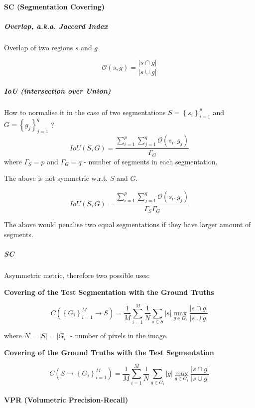 \paragraph{SC (Segmentation Covering)}


\subparagraph*{Overlap, a.k.a. Jaccard Index}

Overlap of two regions $s$ and $g$

\[
\mathcal{O}\left(s,g\right)=\frac{\left|s\cap g\right|}{\left|s\cup g\right|}
\]

\subparagraph*{IoU (intersection over Union)}

How to normalise it in the case of two segmentations $S=\left\{ {s_{i}}\right\} _{i=1}^{p}$
and $G=\left\{ {g_{j}}\right\} _{j=1}^{q}$ ?
\[
IoU(S,G)=\frac{\sum\limits _{i=1}^{p}\sum\limits _{j=1}^{q}\mathcal{O}\left(s_{i},g_{j}\right)}{\Gamma_{G}}
\]
where $\Gamma_{S}=p$ and $\Gamma_{G}=q$ - number of segments in
each segmentation.

The above is not symmetric w.r.t. $S$ and $G$.

\[
IoU(S,G)=\frac{\sum\limits _{i=1}^{p}\sum\limits _{j=1}^{q}\mathcal{O}\left(s_{i},g_{j}\right)}{\Gamma_{S}\Gamma_{G}}
\]


The above would penalise two equal segmentations if they have larger
amount of segments.


\subparagraph*{SC}

Asymmetric metric, therefore two possible uses:

\textbf{Covering of the Test Segmentation with the Ground Truths}

\[
C\left(\left\{ {G_{i}}\right\} _{i=1}^{M}\longrightarrow S\right)=\frac{1}{M}\sum\limits _{i=1}^{M}\frac{1}{N}\sum\limits _{s\in S}\left|s\right|\max_{g\in G_{i}}\frac{\left|s\cap g\right|}{\left|s\cup g\right|}
\]

where $N=\left|S\right|=\left|G_{i}\right|$ - number of pixels in
the image.

\textbf{Covering of the Ground Truths with the Test Segmentation}

\[
C\left(S\longrightarrow\left\{ {G_{i}}\right\} _{i=1}^{M}\right)=\frac{1}{M}\sum\limits _{i=1}^{M}\frac{1}{N}\sum\limits _{g\in G_{i}}\left|g\right|\max_{g\in G_{i}}\frac{\left|s\cap g\right|}{\left|s\cup g\right|}
\]

\paragraph{VPR (Volumetric Precision-Recall)}
\label{VPR-maths}

